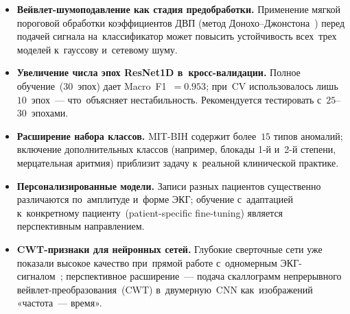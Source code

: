 \begin{itemize}
    \item \textbf{Вейвлет-шумоподавление как стадия предобработки.}
    Применение мягкой пороговой обработки коэффициентов ДВП
    (метод Донохо--Джонстона~\cite{donoho1994}) перед подачей
    сигнала на~классификатор может повысить устойчивость
    всех~трех моделей к~гауссову и~сетевому шуму.

    \item \textbf{Увеличение числа эпох ResNet1D в~кросс-валидации.}
    Полное обучение~(30~эпох) дает Macro~F1~$= 0.953$;
    при~CV использовалось лишь~$10$~эпох~---
    что~объясняет нестабильность. Рекомендуется тестировать
    с~$25$--$30$~эпохами.

    \item \textbf{Расширение набора классов.}
    MIT-BIH содержит более~$15$ типов аномалий;
    включение дополнительных классов (например, блокады
    1-й и~2-й степени, мерцательная аритмия) приблизит
    задачу к~реальной клинической практике.

    \item \textbf{Персонализированные модели.}
    Записи разных пациентов существенно различаются по~амплитуде
    и~форме ЭКГ; обучение с~адаптацией к~конкретному
    пациенту~(patient-specific fine-tuning) является
    перспективным направлением.

    \item \textbf{CWT-признаки для нейронных сетей.}
    Глубокие сверточные сети уже показали высокое качество
    при~прямой работе с~одномерным ЭКГ-сигналом~\cite{acharya2017};
    перспективное расширение~--- подача скаллограмм непрерывного
    вейвлет-преобразования~(CWT) в~двумерную~CNN как~изображений
    «частота~--- время».
\end{itemize}
